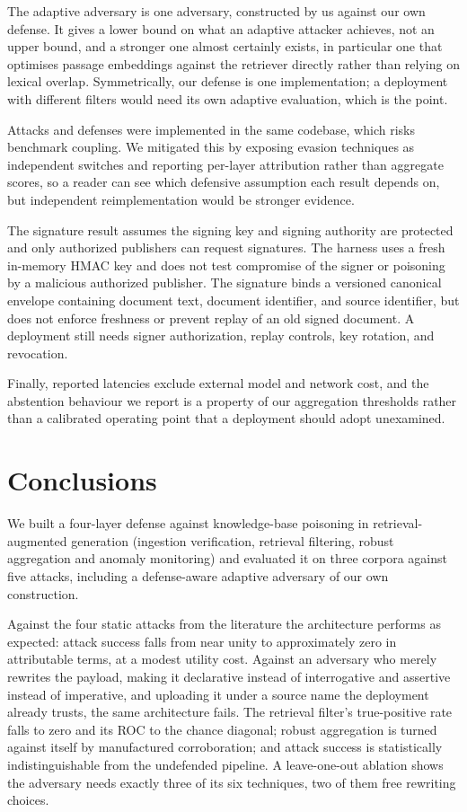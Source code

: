 The adaptive adversary is one adversary, constructed by us against our own defense. It gives a
lower bound on what an adaptive attacker achieves, not an upper bound, and a stronger one
almost certainly exists, in particular one that optimises passage embeddings against the
retriever directly rather than relying on lexical overlap. Symmetrically, our defense is one
implementation; a deployment with different filters would need its own adaptive evaluation,
which is the point.

Attacks and defenses were implemented in the same codebase, which risks benchmark coupling. We
mitigated this by exposing evasion techniques as independent switches and reporting per-layer
attribution rather than aggregate scores, so a reader can see which defensive assumption each
result depends on, but independent reimplementation would be stronger evidence.

The signature result assumes the signing key and signing authority are protected and only
authorized publishers can request signatures. The harness uses a fresh in-memory HMAC key and
does not test compromise of the signer or poisoning by a malicious authorized publisher. The
signature binds a versioned canonical envelope containing document text, document identifier,
and source identifier, but does not enforce freshness or prevent replay of an old signed
document. A deployment still needs signer authorization, replay controls, key rotation, and
revocation.

Finally, reported latencies exclude external model and network cost, and the abstention
behaviour we report is a property of our aggregation thresholds rather than a calibrated
operating point that a deployment should adopt unexamined.

\section{Conclusions}

We built a four-layer defense against knowledge-base poisoning in retrieval-augmented
generation (ingestion verification, retrieval filtering, robust aggregation and anomaly
monitoring) and evaluated it on three corpora against five attacks, including a defense-aware
adaptive adversary of our own construction.

Against the four static attacks from the literature the architecture performs as expected:
attack success falls from near unity to approximately zero in attributable terms, at a modest
utility cost. Against an adversary who merely rewrites the payload, making it declarative
instead of interrogative and assertive instead of imperative, and uploading it under a source
name the deployment already trusts, the same architecture fails. The retrieval filter's true-positive rate falls
to zero and its ROC to the chance diagonal; robust aggregation is turned against itself by
manufactured corroboration; and attack success is statistically indistinguishable from the
undefended pipeline. A leave-one-out ablation shows the adversary needs exactly three of its six
techniques, two of them free rewriting choices.

